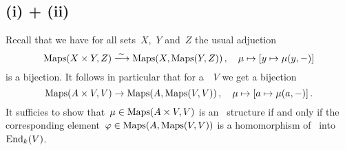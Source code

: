 \section{}





\subsection*{(i) + (ii)}

Recall that we have for all sets~$X$,~$Y$ and~$Z$ the usual adjuction
\[
  \Maps(X \times Y, Z)
  \xlongrightarrow{\sim}
  \Maps(X, \Maps(Y, Z)) \,,
  \quad
          \mu
  \mapsto [y \mapsto \mu(y,-)]
\]
is a bijection.
It follows in particular that for a~{\kvs}~$V$ we get a bijection
\[
          \operatorname{Maps}(A \times V, V)
  \to     \operatorname{Maps}(A, \operatorname{Maps}(V, V)) \,,
  \quad   \mu
  \mapsto [a \mapsto \mu(a,-)]  \,.
\]
It sufficies to show that~$\mu \in \operatorname{Maps}(A \times V, V)$ is an~{} structure if and only if the corresponding element~$\varphi \in \operatorname{Maps}(A, \operatorname{Maps}(V,V))$ is a homomorphism of~{\kalg} into~$\operatorname{End}_k(V)$.

